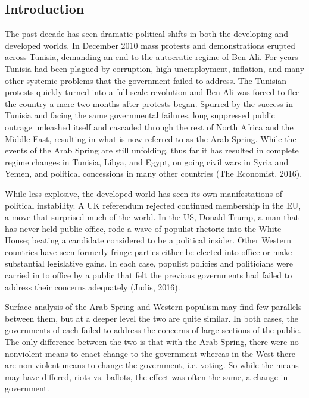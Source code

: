\documentclass[12pt]{article}
\begin{document}
\begin{spacing}{1.5}


\section{Introduction}

The past decade has seen dramatic political shifts in both the developing and developed worlds. In December 2010 mass protests and demonstrations erupted across Tunisia, demanding an end to the autocratic regime of Ben-Ali. For years Tunisia had been plagued by corruption, high unemployment, inflation, and many other systemic problems that the government failed to address. The Tunisian protests quickly turned into a full scale revolution and Ben-Ali was forced to flee the country a mere two months after protests began. Spurred by the success in Tunisia and facing the same governmental failures, long suppressed public outrage unleashed itself and cascaded through the rest of North Africa and the Middle East, resulting in what is now referred to as the Arab Spring. While the events of the Arab Spring are still unfolding, thus far it has resulted in complete regime changes in Tunisia, Libya, and Egypt, on going civil wars in Syria and Yemen, and political concessions in many other countries (The Economist, 2016).  

While less explosive, the developed world has seen its own manifestations of political instability. A UK referendum rejected continued membership in the EU, a move that surprised much of the world. In the US, Donald Trump, a man that has never held public office, rode a wave of populist rhetoric into the White House; beating a candidate considered to be a political insider. Other Western countries have seen formerly fringe parties either be elected into office or make substantial legislative gains. In each case, populist policies and politicians were carried in to office by a public that felt the previous governments had failed to address their concerns adequately (Judis, 2016).

Surface analysis of the Arab Spring and Western populism may find few parallels between them, but at a deeper level the two are quite similar. In both cases, the governments of each failed to address the concerns of large sections of the public. The only difference between the two is that with the Arab Spring, there were no nonviolent means to enact change to the government whereas in the West there are non-violent means to change the government, i.e. voting. So while the means may have differed, riots vs. ballots, the effect was often the same, a change in government.  


\end{spacing}
\end{document}
